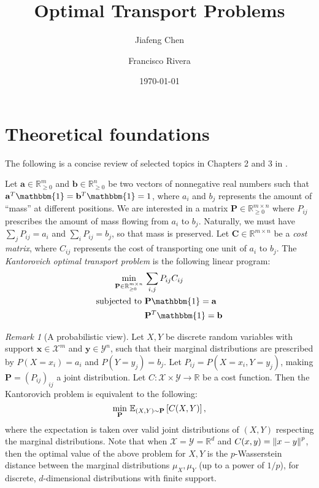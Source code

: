 \documentclass[11pt,reqno]{amsart}
\title{Optimal Transport Problems}
\author{Jiafeng Chen\and Francisco Rivera}
\date{\today}
\newcommand{\R}{\mathbb{R}}
\newcommand{\one}{\mathbbm{1}}
\newcommand{\E}{\mathbb{E}}
\renewcommand{\b}{\mathbf}
\theoremstyle{definition}
\theoremstyle{remark}
\newtheorem{rmk}{Remark}
\begin{document}
    \maketitle
    \section{Theoretical foundations}
    The following is a concise review of selected topics in Chapters 2 and 3 in 
    \cite{peyre2017computational}.
    
    Let $\b a \in \R^m_{\ge 0}$ and $\b b \in \R^n_{\ge 0}$ be two vectors of
    nonnegative real numbers such that $\b a^T \one = \b b^T \one = 1$, where
    $a_i$ and $b_j$ represents the amount of ``mass'' at different positions. 
    We are
    interested in a matrix $\b P \in \R^{m \times n}_{\ge 0}$ where $P_{ij}$
    prescribes
    the amount of mass flowing from $a_i$ to $b_j$. Naturally, we must have
    $\sum_j P_{ij} = a_i$ and $\sum_i P_{ij} = b_j$, so that mass is preserved.
    Let $\b C
    \in \R^{m\times n}$ be a \emph{cost matrix}, where $C_{ij}$ represents the
    cost of transporting one unit of $a_i$ to $b_j$. The \emph{Kantorovich
    optimal transport problem} is the following linear program: \begin{align*}
    \min_{\b P \in  \R^{m \times n}_{\ge 0}} \, & \sum_{i,j} P_{ij} C_{ij} \\
    \text{subjected to } & \b P \one = \b a \\
    & \b P^T \one = \b b
    \end{align*}
    
    \begin{rmk}[A probabilistic view]
    Let $X,Y$ be discrete random variables with support $\b
    x \in \mathcal X^m$ and $\b y \in \mathcal Y^n$, such that their marginal
    distributions are
    prescribed by $P(X = x_i) = a_i$ and $P(Y =
    y_j) = b_j$. Let $P_{ij} = P(X = x_i, Y = y_j)$, making $\b P = (P_{ij})_
    {ij}$ a joint
    distribution. Let $C: \mathcal X \times \mathcal Y \to \R$ be a cost
    function. Then the
    Kantorovich problem is equivalent to the following:\[
    \min_{\b P}\, \E_{(X,Y) \sim \b P}\bk{C(X,Y)},
    \]
    where the expectation is taken over valid joint distributions of $(X,Y)$
    respecting the marginal distributions. Note that when $\mathcal X = \mathcal
    Y = \R^d$ and $C(x,y) = \left\lVert x-y\right\rVert^p$, then the optimal value of the above
    problem for $X,Y$ is the $p$-Wasserstein distance between the marginal
    distributions $\mu_X,\mu_Y$ (up to a power of $1/p$), for discrete,
    $d$-dimensional distributions with finite support.
    \end{rmk}
    
\end{document}

